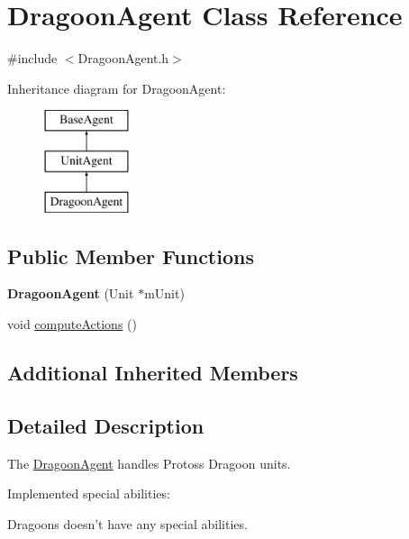 \hypertarget{class_dragoon_agent}{\section{Dragoon\-Agent Class Reference}
\label{class_dragoon_agent}
}


{\ttfamily \#include $<$Dragoon\-Agent.\-h$>$}

Inheritance diagram for Dragoon\-Agent\-:\begin{figure}[H]
\begin{center}
\leavevmode
\includegraphics[height=3.000000cm]{class_dragoon_agent}
\end{center}
\end{figure}
\subsection*{Public Member Functions}
\begin{DoxyCompactItemize}
\item 
\hypertarget{class_dragoon_agent_ae50cce837274f7806f47e835b9ec451b}{{\bfseries Dragoon\-Agent} (Unit $\ast$m\-Unit)}\label{class_dragoon_agent_ae50cce837274f7806f47e835b9ec451b}

\item 
void \hyperlink{class_dragoon_agent_a17736519acfc278cc7d0ba37d7065f1a}{compute\-Actions} ()
\end{DoxyCompactItemize}
\subsection*{Additional Inherited Members}


\subsection{Detailed Description}
The \hyperlink{class_dragoon_agent}{Dragoon\-Agent} handles Protoss Dragoon units.

Implemented special abilities\-:
\begin{DoxyItemize}
\item Dragoons doesn't have any special abilities.
\end{DoxyItemize}


